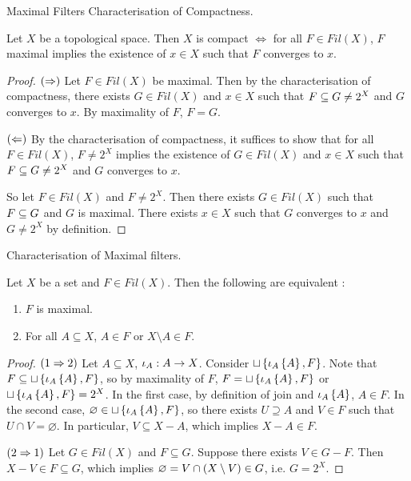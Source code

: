 \documentclass[main.tex]{subfiles}
\begin{document}
\begin{cor} Maximal Filters Characterisation of Compactness.
  
  Let $X$ be a topological space. 
  Then $X$ is compact $\iff$ for all $F \in Fil(X)$, 
  $F$ maximal implies the existence of $x \in X$ such that 
  $F$ converges to $x$.
\end{cor}
\begin{proof}
  $(\Rightarrow)$ Let $F \in Fil(X)$ be maximal. 
  Then by the characterisation of compactness, 
  there exists $G \in Fil(X)$ and $x \in X$ such that
  $F \subseteq G \neq 2^X$ and $G$ converges to $x$.
  By maximality of $F$, $F = G$.

  $(\Leftarrow)$ By the characterisation of compactness,
  it suffices to show that for all $F \in Fil(X)$,
  $F \neq 2^X$ implies the existence of 
  $G \in Fil(X)$ and $x \in X$
  such that $F \subseteq G \neq 2^X$ and $G$ converges to $x$.

  So let $F \in Fil(X)$ and $F \neq 2^X$.
  Then there exists $G \in Fil(X)$ such that 
  $F \subseteq G$ and $G$ is maximal. 
  There exists $x \in X$ such that $G$ converges to $x$
  and $G \neq 2^X$ by definition.
\end{proof}

\begin{thm} Characterisation of Maximal filters.
  
  Let $X$ be a set and $F \in Fil(X)$.
  Then the following are equivalent : 
  \begin{enumerate}
    \item $F$ is maximal. 
    \item For all $A \subseteq X$, $A \in F$ or $X\setminus A \in F$.
  \end{enumerate}
\end{thm}
\begin{proof}
  $(1\Rightarrow 2)$ Let $A \subseteq X$, $\iota_A : A \to X$.
  Consider $\sqcup\left\{\iota_A\left\{A\right\},F\right\}$.
  Note that $F \subseteq \sqcup\left\{\iota_A\left\{A\right\},F\right\}$,
  so by maximality of $F$, 
  $F = \sqcup\left\{\iota_A\left\{A\right\},F\right\}$ or $\sqcup\left\{\iota_A\left\{A\right\},F\right\} = 2^X$.
  In the first case, 
  by definition of join and $\iota_A\left\{A\right\}$, 
  $A \in F$.
  In the second case, 
  $\varnothing \in \sqcup\left\{\iota_A\left\{A\right\},F\right\}$,
  so there exists $U \supseteq A$ and $V \in F$ such that 
  $U \cap V = \varnothing$.
  In particular, $V \subseteq X\minus A$, 
  which implies $X\minus A \in F$.

  $(2\Rightarrow 1)$ Let $G \in Fil(X)$ and $F \subseteq G$.
  Suppose there exists $V \in G\minus F$.
  Then $X\minus V \in F \subseteq G$,
  which implies $\varnothing = V \cap \left(X\setminus V\right) \in G$,
  i.e. $G = 2^X$.
\end{proof}
\end{document}
